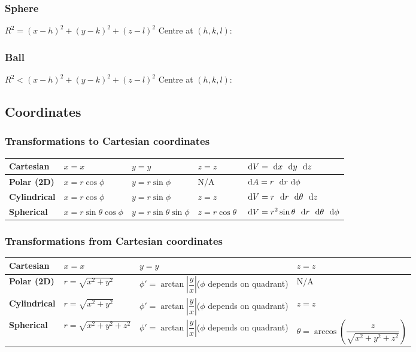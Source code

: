 \subsubsection{Sphere}
\begin{itemize}
\itemt \(R^2 = (x-h)^2 + (y-k)^2 + (z-l)^2\)    
\itemt Centre at $(h,k,l)$:
\end{itemize}

\subsubsection{Ball}
\begin{itemize}
\itemt \(R^2 < (x-h)^2 + (y-k)^2 + (z-l)^2\)  
\itemt Centre at $(h,k,l)$:
\end{itemize}				



\subsection{Coordinates}

\subsubsection{Transformations to Cartesian coordinates}
\def\arraystretch{2.5}
\begin{tabular}{ |l|l|l|l|l| } 
\hline
\textbf{Cartesian}				& \(x = x\)						&\(y = y\)						&\(z=z\)				& \(\dn V = \dn x\ \dn y\ \dn z\)
\\ \hline
\textbf{Polar (2D)}					&\(x = r \cos\phi	\)		&\(y = r\sin\phi\) & N/A & \(\ \mathrm{d}A = r\ \ \mathrm{d}r \ \mathrm{d}\phi\)
\\ \hline
\textbf{Cylindrical}			&\(x = r \cos\phi	\)			&\(y = r\sin\phi\)  			&\(z=z\)				& \(\ \mathrm{d}V = r\ \ \mathrm{d}r\ \ \mathrm{d}\theta\ \ \mathrm{d}z\)
\\ \hline
\textbf{Spherical}				&\(x = r\sin\theta\cos\phi\)	&\(y = r\sin\theta\sin\phi\)	&\(z = r\cos\theta\)	& \(\ \mathrm{d}V = r^2 \sin\theta\ \ \mathrm{d}r\ \ \mathrm{d}\theta\ \ \mathrm{d}\phi \)
\\ \hline
\end{tabular}

\subsubsection{Transformations from Cartesian coordinates}
\begin{tabular}{ |l|l|l|l| } 
\hline
\textbf{Cartesian}				& \(x = x\)						&\(y = y\)				&\(z=z\)
\\ \hline
\textbf{Polar (2D)}					&\(r = \sqrt{x^2 + y^2}	\)		&\(\phi'= \arctan| \dfrac{y}{x} |\)\tab($\phi$ depends on quadrant) & N/A
\\ \hline
\textbf{Cylindrical}			&\(r=\sqrt{x^2 + y^2}\)			&\(\phi'= \arctan| \dfrac{y}{x}|\)\tab($\phi$ depends on quadrant) 				&\(z=z\)
\\ \hline
\textbf{Spherical}				&\(r=\sqrt{x^2 + y^2 + z^2}\)	&\(\phi'= \arctan| \dfrac{y}{x}|\)\tab($\phi$ depends on quadrant)				&\(\theta = \arccos\left(\dfrac{z}{\sqrt{x^2+y^2+z^2}}\right)\)
\\ \hline
\end{tabular}		


